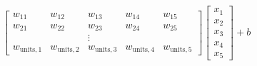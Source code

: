 \documentclass[preview]{standalone}
\begin{document}
\begin{align*}
\begin{bmatrix} w_{11} & w_{12} & w_{13} & w_{14} & w_{15} \\
                       w_{21} & w_{22} & w_{23} & w_{24} & w_{25} \\ & & \vdots & & \\
                       w_{\text{units}, 1} & w_{\text{units}, 2} & w_{\text{units}, 3}  & w_{\text{units}, 4}  & w_{\text{units}, 5}
                       \end{bmatrix} \begin{bmatrix} x_1 \\ x_2 \\ x_3 \\ x_4 \\ x_5 \end{bmatrix} + b
\end{align*}
\end{document}
